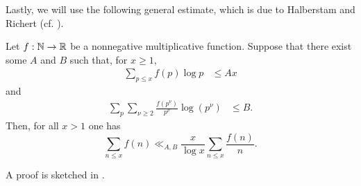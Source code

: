 Lastly, we will use the following general estimate, which is due to Halberstam and Richert (cf. \cite[Theorem 0.1]{divisors}).
\begin{theorem} \label{thm:halberstam-richert}
    Let $f: \mathbb{N} \rightarrow \mathbb{R}$ be a nonnegative multiplicative function.
    Suppose that there exist some $A$ and $B$ such that, for $x \ge 1$,
    \begin{align*}
        \sum \limits_{p \le x} f(p) \log p &\le Ax
    \end{align*}
    and
    \begin{align*}
        \sum \limits_{p} \sum \limits_{\nu \ge 2} \frac{f(p^\nu)}{p^\nu} \log (p^\nu) &\le B.
    \end{align*}
    Then, for all $x > 1$ one has
    \begin{equation*}
        \sum \limits_{n \le x} f(n) \ll_{A, B} \frac{x}{\log x} \sum \limits_{n \le x} \frac{f(n)}{n}.
    \end{equation*}
\end{theorem}
A proof is sketched in \cite[Exercise 00]{divisors}.